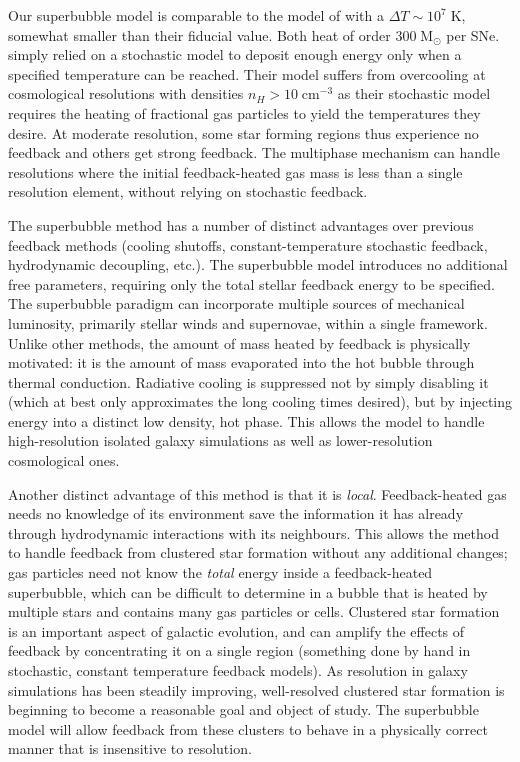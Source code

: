 Our superbubble model is comparable to the model of \citet{DallaVecchia2012}
with a $\Delta T \sim 10^{7}\;\mathrm{K}$, somewhat smaller than their fiducial
value.  Both heat of order $300\;\mathrm{M_\odot}$ per SNe.
\citet{DallaVecchia2012} simply relied on a stochastic model to deposit enough
energy only when a specified temperature can be reached.   Their model suffers
from overcooling at cosmological resolutions with densities $n_H >
10\;\mathrm{cm^{-3}}$ as their stochastic model requires the heating of
fractional gas particles to yield the temperatures they desire.   At moderate
resolution, some star forming regions thus experience no feedback and others get
strong feedback.  The multiphase mechanism can handle resolutions where the
initial feedback-heated gas mass is less than a single resolution element,
without relying on stochastic feedback.

The superbubble method has a number of distinct advantages over previous feedback
methods (cooling shutoffs, constant-temperature stochastic feedback,
hydrodynamic decoupling, etc.).  The superbubble model introduces no additional
free parameters, requiring only the total stellar feedback energy to be
specified.  The superbubble paradigm can incorporate multiple sources of
mechanical luminosity, primarily stellar winds and supernovae, within a single
framework.  Unlike other methods, the amount of mass heated by feedback is
physically motivated: it is the amount of mass evaporated into the hot bubble
through thermal conduction.  Radiative cooling is suppressed not by simply
disabling it (which at best only approximates the long cooling times desired),
but by injecting energy into a distinct low density, hot phase.  This allows the
model to handle high-resolution isolated galaxy simulations as well as
lower-resolution cosmological ones.  

Another distinct advantage of this method is that it is {\it local}.
Feedback-heated gas needs no knowledge of its environment save the information
it has already through hydrodynamic interactions with its neighbours.  This
allows the method to handle feedback from clustered star formation without any
additional changes; gas particles need not know the {\it total} energy inside
a feedback-heated superbubble, which can be difficult to determine in a bubble
that is heated by multiple stars and contains many gas particles or cells.
Clustered star formation is an important aspect of galactic evolution, and can
amplify the effects of feedback by concentrating it on a single region
(something done by hand in stochastic, constant temperature feedback models).
As resolution in galaxy simulations has been steadily improving, well-resolved
clustered star formation is beginning to become a reasonable goal and object of
study.  The superbubble model will allow feedback from these clusters to behave
in a physically correct manner that is insensitive to resolution.

